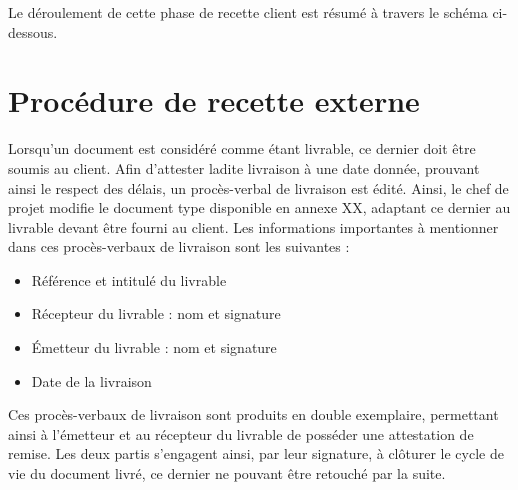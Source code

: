Le déroulement de cette phase de recette client est résumé à travers le schéma ci-dessous.


\section{Procédure de recette externe}

Lorsqu’un document est considéré comme étant livrable, ce dernier doit être soumis au client. Afin d’attester ladite livraison à une date donnée, prouvant ainsi le respect des délais, un procès-verbal de livraison est édité. Ainsi, le chef de projet modifie le document type disponible en annexe XX, adaptant ce dernier au livrable devant être fourni au client. Les informations importantes à mentionner dans ces procès-verbaux de livraison sont les suivantes : \\

\begin{itemize}
    \item[\textbullet] Référence et intitulé du livrable
    \item[\textbullet] Récepteur du livrable : nom et signature
    \item[\textbullet] Émetteur du livrable : nom et signature
    \item[\textbullet] Date de la livraison \\
\end{itemize}

Ces procès-verbaux de livraison sont produits en double exemplaire, permettant ainsi à l’émetteur et au récepteur du livrable de posséder une attestation de remise. Les deux partis s’engagent ainsi, par leur signature, à clôturer le cycle de vie du document livré, ce dernier ne pouvant être retouché par la suite.

